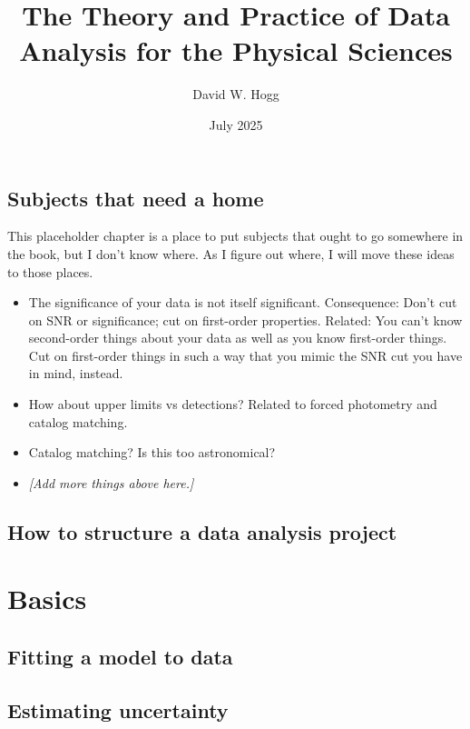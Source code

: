 \documentclass[10pt]{book}
\title{\bfseries%
The Theory and Practice of Data Analysis
for the Physical Sciences}
\author{David W. Hogg}
\date{July 2025}
\begin{document}
\maketitle
\tableofcontents



\chapter*{Subjects that need a home}
This placeholder chapter is a place to put subjects that ought to go somewhere in the book, but I don't know where.
As I figure out where, I will move these ideas to those places.
\begin{itemize}
  \item The significance of your data is not itself significant.
  Consequence: Don't cut on SNR or significance; cut on first-order properties.
  Related: You can't know second-order things about your data as well as you know first-order things.
  Cut on first-order things in such a way that you mimic the SNR cut you have in mind, instead.
  \item How about upper limits vs detections?
  Related to forced photometry and catalog matching.
  \item Catalog matching? Is this too astronomical?
  \item \textsl{[Add more things above here.]}
\end{itemize}

\chapter{How to structure a data analysis project}

\part{Basics}

\chapter{Fitting a model to data}





\chapter{Estimating uncertainty}
\end{document}
